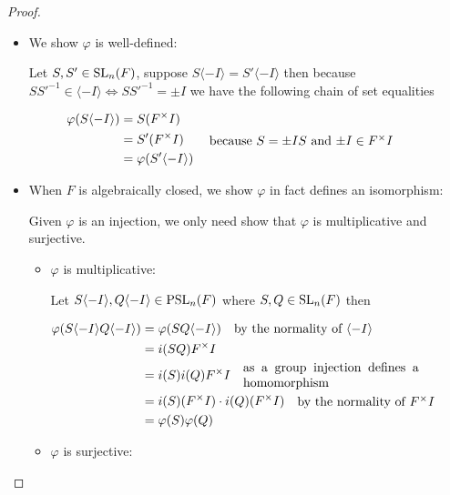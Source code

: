 \begin{proof}
\begin{itemize}
    \item We show $\varphi$ is well-defined:

Let $S, S' \in \operatorname{SL}_n(F)$, suppose $S \langle -I\rangle = S'\langle -I\rangle$ then because $SS'^{-1} \in \langle -I\rangle \iff SS'^{-1} = \pm I$ we have the following chain of set equalities

\begin{align*}
    \varphi(S \langle -I \rangle) 
    &= S (F^\times I)\\
    &= S' (F^\times I) \qquad \parbox[c]{0.5
    \linewidth}{because $S = \pm I S$ and $\pm I \in F^\times I$}\\
    &= \varphi(S' \langle -I\rangle)
\end{align*}

\item When $F$ is algebraically closed, we show $\varphi$ in fact defines an isomorphism:

Given $\varphi$ is an injection, we only need show that $\varphi$ is multiplicative and surjective.
\begin{itemize}
    \item $\varphi$ is multiplicative:

    Let $S \langle-I\rangle, Q\langle-I\rangle \in \operatorname{PSL}_n(F)$ where $S, Q \in \operatorname{SL}_n(F)$ then

    \begin{align*}
    \varphi(S \langle-I\rangle  Q\langle-I\rangle ) &= \varphi(SQ \langle -I\rangle) \quad \parbox[c]{0.4\linewidth}{by the normality of $\langle -I \rangle$}\\
    &= i(SQ) F^\times I\\
    &= i(S) i(Q) F^\times I \quad  \parbox[c]{0.4\linewidth}{as a group injection defines a homomorphism}\\
    &= i(S) (F^\times I) \cdot i(Q)(F^\times I) \quad \parbox[c] {0.4\linewidth}{ by the normality of $F^\times I$}\\
    &= \varphi(S) \varphi(Q)
    \end{align*}
    
    \item $\varphi$ is surjective:

    
\end{itemize}


\end{itemize}

\end{proof}

